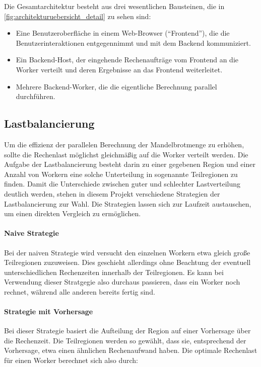Die Gesamtarchitektur besteht aus drei wesentlichen Bausteinen, die in \autoref{fig:architekturuebersicht_detail} zu sehen sind:
\begin{itemize}
	\item Eine Benutzeroberfläche in einem Web-Browser (“Frontend”), die die Benutzerinteraktionen entgegennimmt und mit dem Backend kommuniziert.
	\item Ein Backend-Host, der eingehende Rechenaufträge vom Frontend an die Worker verteilt und deren Ergebnisse an das Frontend weiterleitet.
	\item Mehrere Backend-Worker, die die eigentliche Berechnung parallel durchführen.
\end{itemize}

\subsection{Lastbalancierung}\label{sec:load_balancing_concepts}
Um die effizienz der parallelen Berechnung der Mandelbrotmenge zu erhöhen, sollte die Rechenlast möglichst gleichmäßig auf die Worker verteilt werden.
Die Aufgabe der Lastbalancierung besteht darin zu einer gegebenen Region und einer Anzahl von Workern eine solche Unterteilung in sogenannte Teilregionen zu finden.
Damit die Unterschiede zwischen guter und schlechter Lastverteilung deutlich werden, stehen in diesem Projekt verschiedene Strategien der Lastbalancierung zur Wahl.
Die Strategien lassen sich zur Laufzeit austauschen, um einen direkten Vergleich zu ermöglichen.

\paragraph{Naive Strategie}
Bei der naiven Strategie wird versucht den einzelnen Workern etwa gleich große Teilregionen zuzuweisen.
Dies geschieht allerdings ohne Beachtung der eventuell unterschiedlichen Rechenzeiten innerhalb der Teilregionen.
Es kann bei Verwendung dieser Stratgegie also durchaus passieren, dass ein Worker noch rechnet, während alle anderen bereits fertig sind.

\paragraph{Strategie mit Vorhersage}
Bei dieser Strategie basiert die Aufteilung der Region auf einer Vorhersage über die Rechenzeit.
Die Teilregionen werden so gewählt, dass sie, entsprechend der Vorhersage, etwa einen ähnlichen Rechenaufwand haben.
Die optimale Rechenlast für einen Worker berechnet sich also durch:

